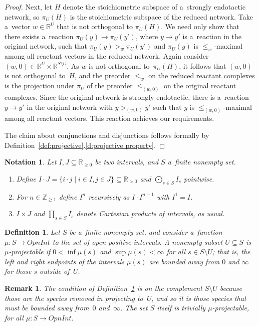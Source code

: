 \documentclass[pdftex]{sigma}
\newtheorem{Definition}[Theorem]{Definition}
\newtheorem{Remark}[Theorem]{Remark}
\newtheorem{Notation}[Theorem]{Notation}
\begin{document}
\begin{proof}
Next, let $H$ denote the stoichiometric subspace of a~strongly endotactic network, so $\pi_U(H)$ is the stoichiometric
subspace of the reduced network.
Take a~vector $w\in\mathbb{R}^{U}$ that is not orthogonal to $\pi_U(H)$.
We need only show that there exists a~reaction $\pi_U(y)\to\pi_U(y')$, where $y\to y'$ is a~reaction in the original
network, such that $\pi_U(y)>_w\pi_U(y')$ and $\pi_U(y)$ is $\leq_w$-maximal among all reactant vectors in the reduced
network.
Again consider $(w,0)\in\mathbb{R}^U\times\mathbb{R}^{S\setminus U}$.
As $w$ is not orthogonal to~$\pi_U(H)$, it follows that $(w,0)$ is not orthogonal to~$H$, and the preorder $\leq_w$ on
the reduced reactant complexes is the projection under $\pi_U$ of the preorder $\leq_{(w,0)}$ on the original reactant
complexes.
Since the original network is strongly endotactic, there is a~reaction $y\to y'$ in the original network with
$y>_{(w,0)}y'$ such that $y$ is $\leq_{(w,0)}$-maximal among all reactant vectors.
This reaction achieves our requirements.

The claim about conjunctions and disjunctions follows formally by Def\/inition~\ref{def:projective}.\ref{d:projective
property}.
\end{proof}
\begin{Notation}
\label{n:interval-arithmetic}
Let $I,J\subseteq\mathbb{R}_{\geq 0}$ be two intervals, and $S$ a~f\/inite nonempty set.
\begin{enumerate}\itemsep=0pt
\item Def\/ine $I\cdot J=\{i\cdot j\mid i\in I,j\in J\}\subseteq\mathbb{R}_{>0}$ and $\bigodot_{s\in S}I_s$
pointwise.

\item For $n\in\mathbb{Z}_{\geq1}$ def\/ine $I^n$ recursively as $I\cdot I^{n-1}$ with $I^1=I$.

\item $I\times J$ and $\prod_{s\in S}I_s$ denote Cartesian products of intervals, as usual.
\end{enumerate}
\end{Notation}
\begin{Definition}
\label{d:projectable}
Let $S$ be a~f\/inite nonempty set, and consider a~function $\mu:S\to\mathit{OpnInt}$ to the set of open positive
intervals.
A nonempty subset $U\subseteq S$ is \emph{$\mu$-projectable} if $0<\inf{\mu(s)}$ and $\sup{\mu(s)}<\infty$ for all
$s\in S\setminus U$; that is, the left and right endpoints of the intervals $\mu(s)$ are bounded away from $0$ and
$\infty$ for those $s$ outside of~$U$.
\end{Definition}
\begin{Remark}
\label{r:complement}
The condition of Def\/inition~\ref{d:projectable} is on the complement $S\setminus U$ because those are the species
removed in projecting to~$U$, and so it is those species that must be bounded away from~$0$ and~$\infty$.
The set $S$ itself is trivially $\mu$-projectable, for all $\mu:S\to\mathit{OpnInt}$.
\end{Remark}
\end{document}

